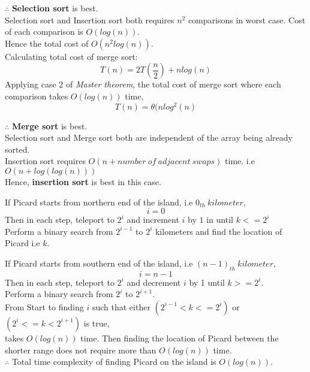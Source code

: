 \documentclass[12pt,twoside]{article}
\begin{document}
\begin{problems}
\begin{problemparts}
$\therefore$ \textbf{Selection sort} is best.
\\
\problempart %
Selection sort and Insertion sort both requires $n^2$ comparisons in worst case. Cost of each comparison is $O(log(n))$. \\
Hence the total cost of $O(n^2 log(n))$. \\

Calculating total cost of merge sort: \\
\[T(n) = 2T(\frac{n}{2}) + n log (n) \]
Applying case 2 of \textit{Master theorem}, the total cost of merge sort where each comparison takes $O(log(n))$ time,
\[T(n) = \theta(n log^2 (n)\] 

$\therefore$ \textbf{Merge sort} is best.
\\
\problempart %
Selection sort and Merge sort both are independent of the array being already sorted. \\
Insertion sort requires $O(n + number\ of\ adjacent\ swaps)$ time. i.e \\
$O(n + log(log(n)))$ \\
Hence, \textbf{insertion sort} is best in this case.

\end{problemparts}

\newpage
\problem  %
If Picard starts from northern end of the island, i.e $0_{th}\  kilometer$,  \\
\[i = 0 \] 
Then in each step, teleport to $2^i$ and increment $i$ by $1$ in until $k <= 2^i$ \\
Perform a binary search from $2^{i-1}$ to $2^i$ kilometers and find the location of Picard i.e $k$.

If Picard starts from southern end of the island, i.e $(n-1)_{th}\ kilometer$, \\
\[i = n-1\]
Then in each step, teleport to $2^i$ and decrement $i$ by 1 until $k >= 2^i$. \\
Perform a binary search from $2^i$ to $2^{i+1}$. \\

From Start to finding $i$ such that either $(2^{i-1} < k <= 2^i)$ or $(2^i <= k < 2^{i+1})$ is true, \\
takes $O(log(n))$ time.
Then finding the location of Picard between the shorter range does not require more than $O(log(n))$ time. \\

$\therefore$ Total time complexity of finding Picard on the island is $O(log(n))$.


\end{problems}
\end{document}

